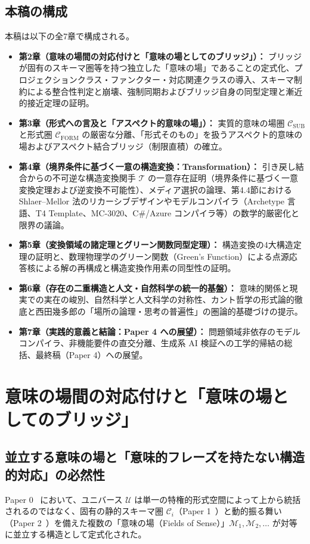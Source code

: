 \documentclass[11pt,a4paper]{ltjsarticle}
\theoremstyle{definition}
\theoremstyle{plain}
\theoremstyle{remark}
\newcommand{\CFORM}{\mathcal{C}_{\mathrm{FORM}}}
\newcommand{\CSUB}{\mathcal{C}_{\mathrm{SUB}}}
\begin{document}
\subsection{本稿の構成}
本稿は以下の全7章で構成される。

\begin{itemize}
    \item \textbf{第2章（意味の場間の対応付けと「意味の場としてのブリッジ」）：} ブリッジが固有のスキーマ圏等を持つ独立した「意味の場」であることの定式化、プロジェクションクラス・ファンクター・対応関連クラスの導入、スキーマ制約による整合性判定と崩壊、強制同期およびブリッジ自身の同型定理と漸近的接近定理の証明。
    \item \textbf{第3章（形式への言及と「アスペクト的意味の場」）：} 実質的意味の場圏 $\CSUB$ と形式圏 $\CFORM$ の厳密な分離、「形式そのもの」を扱うアスペクト的意味の場およびアスペクト結合ブリッジ（制限直積）の確立。
    \item \textbf{第4章（境界条件に基づく一意の構造変換：Transformation）：} 引き戻し結合からの不可逆な構造変換関手 $\mathcal{T}$ の一意存在証明（境界条件に基づく一意変換定理および逆変換不可能性）、メディア選択の論理、第4.4節における Shlaer--Mellor 法のリカーシブデザインやモデルコンパイラ（Archetype 言語、T4 Template、MC-3020、C\#/Azure コンパイラ等）の数学的厳密化と限界の議論。
    \item \textbf{第5章（変換領域の諸定理とグリーン関数同型定理）：} 構造変換の4大構造定理の証明と、数理物理学のグリーン関数（Green's Function）による点源応答核による解の再構成と構造変換作用素の同型性の証明。
    \item \textbf{第6章（存在の二重構造と人文・自然科学の統一的基盤）：} 意味的関係と現実での実在の峻別、自然科学と人文科学の対称性、カント哲学の形式論的徹底と西田幾多郎の「場所の論理・思考の普遍性」の圏論的基礎づけの提示。
    \item \textbf{第7章（実践的意義と結論：Paper 4 への展望）：} 問題領域非依存のモデルコンパイラ、非機能要件の直交分離、生成系 AI 検証への工学的帰結の総括、最終稿（Paper 4）への展望。
\end{itemize}
\section{意味の場間の対応付けと「意味の場としてのブリッジ」}

\subsection{並立する意味の場と「意味的フレーズを持たない構造的対応」の必然性}
Paper 0~\cite{ota2026paper0} において、ユニバース $\mathcal{U}$ は単一の特権的形式空間によって上から統括されるのではなく、固有の静的スキーマ圏 $\mathcal{C}_i$（Paper 1~\cite{ota2026paper1}）と動的振る舞い（Paper 2~\cite{ota2026paper2}）を備えた複数の「意味の場（Fields of Sense）」$\mathcal{M}_1, \mathcal{M}_2, \dots$ が対等に並立する構造として定式化された。
\end{document}
